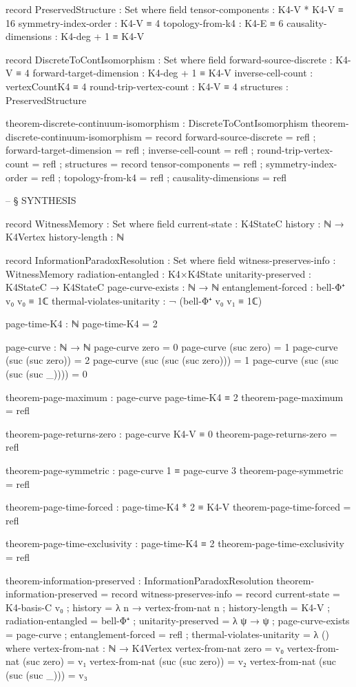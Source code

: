 \documentclass[11pt,a4paper]{book}
\begin{document}
\begin{code}
record PreservedStructure : Set where
  field
    tensor-components : K4-V * K4-V ≡ 16
    symmetry-index-order : K4-V ≡ 4
    topology-from-k4 : K4-E ≡ 6
    causality-dimensions : K4-deg + 1 ≡ K4-V

record DiscreteToContIsomorphism : Set where
  field
    forward-source-discrete : K4-V ≡ 4
    forward-target-dimension : K4-deg + 1 ≡ K4-V
    inverse-cell-count : vertexCountK4 ≡ 4
    round-trip-vertex-count : K4-V ≡ 4
    structures : PreservedStructure

theorem-discrete-continuum-isomorphism : DiscreteToContIsomorphism
theorem-discrete-continuum-isomorphism = record
  { forward-source-discrete = refl
  ; forward-target-dimension = refl
  ; inverse-cell-count = refl
  ; round-trip-vertex-count = refl
  ; structures = record
      { tensor-components = refl
      ; symmetry-index-order = refl
      ; topology-from-k4 = refl
      ; causality-dimensions = refl
      }
  }


-- § SYNTHESIS

record WitnessMemory : Set where
  field
    current-state : K4StateC
    history : ℕ → K4Vertex
    history-length : ℕ

record InformationParadoxResolution : Set where
  field
    witness-preserves-info : WitnessMemory
    radiation-entangled : K4×K4State
    unitarity-preserved : K4StateC → K4StateC
    page-curve-exists : ℕ → ℕ
    entanglement-forced : bell-Φ⁺ v₀ v₀ ≡ 1ℂ
    thermal-violates-unitarity : ¬ (bell-Φ⁺ v₀ v₁ ≡ 1ℂ)

page-time-K4 : ℕ
page-time-K4 = 2






page-curve : ℕ → ℕ
page-curve zero = 0
page-curve (suc zero) = 1
page-curve (suc (suc zero)) = 2
page-curve (suc (suc (suc zero))) = 1
page-curve (suc (suc (suc (suc _)))) = 0

theorem-page-maximum : page-curve page-time-K4 ≡ 2
theorem-page-maximum = refl

theorem-page-returns-zero : page-curve K4-V ≡ 0
theorem-page-returns-zero = refl

theorem-page-symmetric : page-curve 1 ≡ page-curve 3
theorem-page-symmetric = refl

theorem-page-time-forced : page-time-K4 * 2 ≡ K4-V
theorem-page-time-forced = refl

theorem-page-time-exclusivity : page-time-K4 ≡ 2
theorem-page-time-exclusivity = refl

theorem-information-preserved : InformationParadoxResolution
theorem-information-preserved = record
  { witness-preserves-info = record 
      { current-state = K4-basis-C v₀
      ; history = λ n → vertex-from-nat n
      ; history-length = K4-V }
  ; radiation-entangled = bell-Φ⁺
  ; unitarity-preserved = λ ψ → ψ
  ; page-curve-exists = page-curve
  ; entanglement-forced = refl
  ; thermal-violates-unitarity = λ ()
  }
  where
    vertex-from-nat : ℕ → K4Vertex
    vertex-from-nat zero = v₀
    vertex-from-nat (suc zero) = v₁
    vertex-from-nat (suc (suc zero)) = v₂
    vertex-from-nat (suc (suc (suc _))) = v₃


\end{code}
\end{document}
